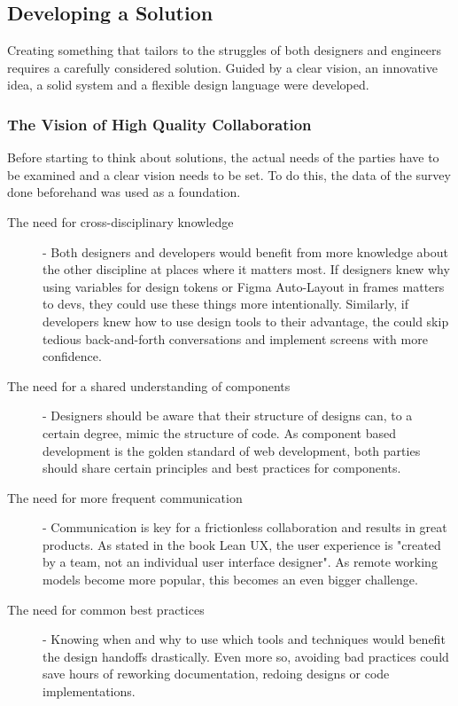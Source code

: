 \newpage
\subsection{Developing a Solution}
Creating something that tailors to the struggles of both designers and engineers requires a
carefully considered solution. Guided by a clear vision, an innovative idea, a solid system and a
flexible design language were developed.

\subsubsection{The Vision of High Quality Collaboration}
Before starting to think about solutions, the actual needs of the parties have to be examined and a
clear vision needs to be set. To do this, the data of the survey done beforehand was used as a
foundation.

\begin{description}
    \item[The need for cross-disciplinary knowledge] - Both designers and developers would benefit
          from more knowledge about the other discipline at places where it matters most. If designers
          knew why using variables for design tokens or Figma Auto-Layout in frames matters to devs, they
          could use these things more intentionally. Similarly, if developers knew how to use design tools
          to their advantage, the could skip tedious back-and-forth conversations and implement screens
          with more confidence.
    \item[The need for a shared understanding of components] - Designers should be aware that their
          structure of designs can, to a certain degree, mimic the structure of code. As component based
          development is the golden standard of web development, both parties should share certain
          principles and best practices for components.
    \item[The need for more frequent communication] - Communication is key for a frictionless
          collaboration and results in great products. As stated in the book Lean UX, the user experience
          is "created by a team, not an individual user interface designer".
           As remote working models become more
          popular, this becomes an even bigger challenge.
    \item[The need for common best practices] - Knowing when and why to use which tools and
          techniques would benefit the design handoffs drastically. Even more so, avoiding bad practices
          could save hours of reworking documentation, redoing designs or code implementations.
\end{description}

